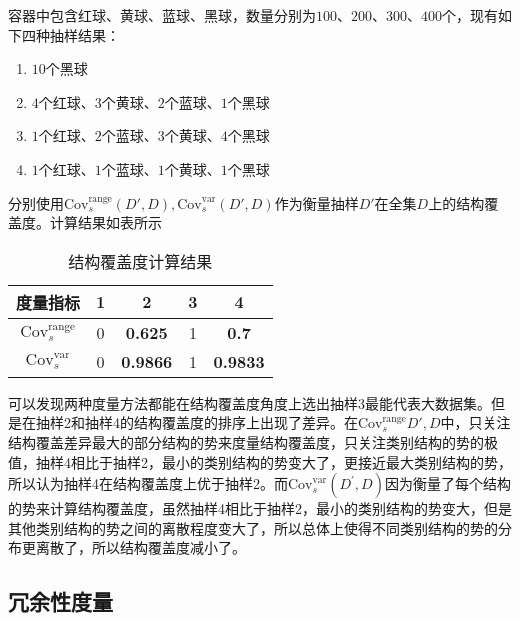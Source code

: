 \documentclass{../notes}
\newcommand{\Cov}{\text{Cov}}
\begin{document}
    \begin{example}
        容器中包含红球、黄球、蓝球、黑球，数量分别为$100$、$200$、$300$、$400$个，现有如下四种抽样结果：

        \begin{enumerate}
            \item $10$个黑球
            \item $4$个红球、$3$个黄球、$2$个蓝球、$1$个黑球
            \item $1$个红球、$2$个蓝球、$3$个黄球、$4$个黑球
            \item $1$个红球、$1$个蓝球、$1$个黄球、$1$个黑球
        \end{enumerate}

        分别使用$\Cov_s^\text{range}(D', D), \Cov_s^\text{var}(D', D)$作为衡量抽样$D'$在全集$D$上的结构覆盖度。计算结果如表所示

        \begin{table}[ht]
            \centering
            \caption{结构覆盖度计算结果}
            \begin{tabular}{ccccc}
                \toprule
                度量指标 & 1 & 2 & 3 & 4 \\
                \midrule
                $\Cov_s^\text{range}$ & 0 & \textbf{0.625} & 1 & \textbf{0.7} \\
                $\Cov_s^\text{var}$ & 0 & \textbf{0.9866} & 1 & \textbf{0.9833} \\
                \bottomrule
            \end{tabular}
        \end{table}
    \end{example}

    可以发现两种度量方法都能在结构覆盖度角度上选出抽样3最能代表大数据集。但是在抽样2和抽样4的结构覆盖度的排序上出现了差异。在$\Cov_s^{\text{range}}D', D$中，只关注结构覆盖差异最大的部分结构的势来度量结构覆盖度，只关注类别结构的势的极值，抽样4相比于抽样2，最小的类别结构的势变大了，更接近最大类别结构的势，所以认为抽样4在结构覆盖度上优于抽样2。而$\Cov_s^{\text{var}}\left(D^\prime,D\right)$因为衡量了每个结构的势来计算结构覆盖度，虽然抽样4相比于抽样2，最小的类别结构的势变大，但是其他类别结构的势之间的离散程度变大了，所以总体上使得不同类别结构的势的分布更离散了，所以结构覆盖度减小了。

    \subsection{冗余性度量}
\end{document}
